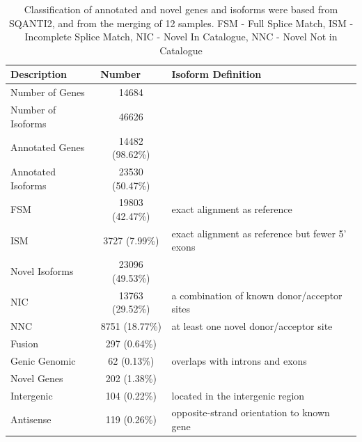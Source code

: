 \vspace{1cm}
\begin{table}[!h]
	\caption[Gene and Isoform classification from Whole Transcriptome Iso-Seq of Tg4510]%
	{Classification of annotated and novel genes and isoforms were based from SQANTI2, and from the merging of 12 samples. FSM - Full Splice Match, ISM - Incomplete Splice Match, NIC - Novel In Catalogue, NNC - Novel Not in Catalogue }
	\label{tab:sqanti_output_whole}
	\begin{tabularx}{1\textwidth}{lcl}
		\toprule
		Description              & \multicolumn{1}{l}{Number} & Isoform Definition               \\ \midrule
		Number of Genes    & 14684                      &                                  \\
		Number of Isoforms & 46626                      &                                  \\
		Annotated Genes          & 14482 (98.62\%)            &                                  \\
		\hspace{3mm}Annotated Isoforms       & 23530 (50.47\%)            &                                  \\
		\hspace{6mm}FSM          & 19803 (42.47\%) & exact alignment as reference  \\
		\hspace{6mm}ISM  & 3727 (7.99\%)   & exact alignment as reference but fewer 5’ exons       \\
		\hspace{3mm}Novel Isoforms           & 23096 (49.53\%)            &                                  \\
		\hspace{6mm}NIC      & 13763 (29.52\%) & a combination of known donor/acceptor sites                    \\
		\hspace{6mm}NNC   & 8751 (18.77\%)  & at least one novel donor/acceptor site    \\
		\hspace{6mm}Fusion                   & 297 (0.64\%)               &                                  \\
		\hspace{6mm}Genic Genomic            & 62 (0.13\%)                & overlaps with introns and exons  \\
		Novel Genes              & 202 (1.38\%)               &                                  \\
		\hspace{6mm}Intergenic               & 104 (0.22\%)               & located in the intergenic region \\
		\hspace{6mm}Antisense                     & 119 (0.26\%)    & opposite-strand orientation to known gene           \\ \bottomrule
	\end{tabularx}
\end{table}

